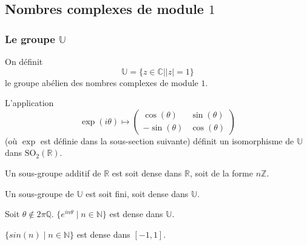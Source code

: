 




	\subsection{Nombres complexes de module \texorpdfstring{$1$}{1}}
	
	\subsubsection{Le groupe \texorpdfstring{$\mathbb{U}$}{U}}
	
	
	\begin{definition}
		On définit
		\[ \mathbb{U} = \{ z \in \mathbb{C} \mid \vert z \vert = 1 \} \]
		le groupe abélien des nombres complexes de module $1$.
	\end{definition}
	
	\begin{proposition}
		L'application
		\[ \exp(i\theta) \mapsto
			\begin{pmatrix}
				\cos(\theta) & \sin(\theta) \\
				-\sin(\theta) & \cos(\theta)
			\end{pmatrix}
		\]
		(où $\exp$ est définie dans la sous-section suivante) définit un isomorphisme de $\mathbb{U}$ dans $\mathrm{SO}_2(\mathbb{R})$.
	\end{proposition}
	
	
	\begin{proposition}
		Un sous-groupe additif de $\mathbb{R}$ est soit dense dans $\mathbb{R}$, soit de la forme $n\mathbb{Z}$.
	\end{proposition}
	
	\begin{corollary}
		Un sous-groupe de $\mathbb{U}$ est soit fini, soit dense dans $\mathbb{U}$.
	\end{corollary}
	
	\begin{corollary}
		Soit $\theta \notin 2\pi\mathbb{Q}$. $\{ e^{in\theta} \mid n \in \mathbb{N} \}$ est dense dans $\mathbb{U}$.
	\end{corollary}
	
	\begin{application}
		$\{ sin(n) \mid n \in \mathbb{N} \}$ est dense dans $[-1,1]$.
	\end{application}
	
